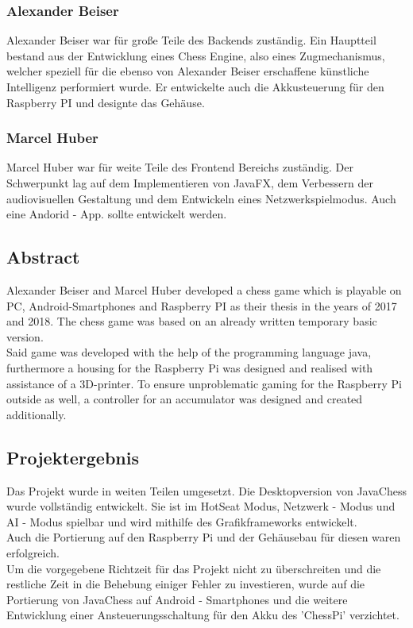 \documentclass[12pt,a4paper]{article}
\begin{document}
	\subsubsection{Alexander Beiser}
	Alexander Beiser war für große Teile des Backends zuständig. Ein Hauptteil bestand aus der Entwicklung eines Chess Engine, also eines Zugmechanismus, welcher speziell für die ebenso von Alexander Beiser erschaffene künstliche Intelligenz performiert wurde. Er entwickelte auch die Akkusteuerung für den Raspberry PI und designte das Gehäuse.
	
	\subsubsection{Marcel Huber}
	Marcel Huber war für weite Teile des Frontend Bereichs zuständig. Der Schwerpunkt lag auf dem Implementieren von JavaFX, dem Verbessern der audiovisuellen Gestaltung und dem Entwickeln eines Netzwerkspielmodus. Auch eine Andorid - \ac{App.} sollte entwickelt werden.
	
	
	\subsection{Abstract}
	
	Alexander Beiser and Marcel Huber developed a chess game which is playable on PC, Android-Smartphones and Raspberry PI as their thesis in the years of 2017 and 2018. The chess game was based on an already written temporary basic version.\\
Said game was developed with the help of the programming language java, furthermore a housing for the Raspberry Pi was designed and realised with assistance of a 3D-printer. To ensure unproblematic gaming for the Raspberry Pi outside as well, a controller for an accumulator was designed and created additionally.

	
	
 \subsection{Projektergebnis}

	Das Projekt wurde in weiten Teilen umgesetzt. Die Desktopversion von JavaChess wurde vollständig entwickelt. Sie ist im HotSeat Modus, Netzwerk - Modus und AI - Modus spielbar und wird mithilfe des Grafikframeworks entwickelt.\\ Auch die Portierung auf den Raspberry Pi und der Gehäusebau für diesen waren erfolgreich.\\
Um die vorgegebene Richtzeit für das Projekt nicht zu überschreiten und die restliche Zeit in die Behebung einiger Fehler zu investieren, wurde auf die Portierung von JavaChess auf Android - Smartphones und die weitere Entwicklung einer Ansteuerungsschaltung für den Akku des 'ChessPi' verzichtet.
\end{document}
